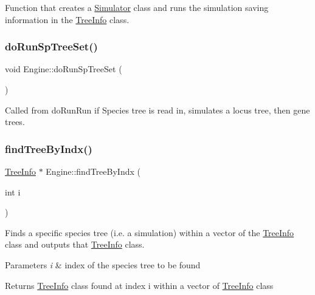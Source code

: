 Function that creates a \mbox{\hyperlink{class_simulator}{Simulator}} class and runs the simulation saving information in the \mbox{\hyperlink{class_tree_info}{Tree\+Info}} class. 

\mbox{\label{class_engine_ae91f74b568f58b564179882def6b8779}} 
\subsubsection{\texorpdfstring{doRunSpTreeSet()}{doRunSpTreeSet()}}
{\footnotesize\ttfamily void Engine\+::do\+Run\+Sp\+Tree\+Set (\begin{DoxyParamCaption}{ }\end{DoxyParamCaption})}



Called from do\+Run\+Run if Species tree is read in, simulates a locus tree, then gene trees. 

\mbox{\label{class_engine_a52bf7ab3f2483fd8494311627c278efe}} 
\subsubsection{\texorpdfstring{findTreeByIndx()}{findTreeByIndx()}}
{\footnotesize\ttfamily \mbox{\hyperlink{class_tree_info}{Tree\+Info}} $\ast$ Engine\+::find\+Tree\+By\+Indx (\begin{DoxyParamCaption}\item[{int}]{i }\end{DoxyParamCaption})}



Finds a specific species tree (i.\+e. a simulation) within a vector of the \mbox{\hyperlink{class_tree_info}{Tree\+Info}} class and outputs that \mbox{\hyperlink{class_tree_info}{Tree\+Info}} class. 


\begin{DoxyParams}{Parameters}
{\em i} & index of the species tree to be found \\
\hline
\end{DoxyParams}
\begin{DoxyReturn}{Returns}
\mbox{\hyperlink{class_tree_info}{Tree\+Info}} class found at index i within a vector of \mbox{\hyperlink{class_tree_info}{Tree\+Info}} class 
\end{DoxyReturn}
\mbox{\label{class_engine_a34b92fdcc419808389cf55fc387743b6}} 
